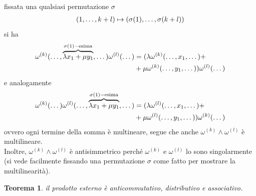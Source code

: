 \documentclass[oneside, 11pt]{amsbook}
\makeatletter
\newcommand{\0}{{(0)}}
\newcommand{\3}{{(3)}}
\theoremstyle{colonplain}
\newtheorem{thm}{Teorema}[chapter]
\theoremstyle{colondefinition}
\theoremstyle{colonremark}
\numberwithin{equation}{chapter}
\renewcommand{\proofname}{Dimostrazione}
\renewenvironment{proof}[1][\proofname]{\par
  \pushQED{\qed}%
  \normalfont \topsep6\p@\@plus6\p@\relax
  \trivlist
  \item[\hskip\labelsep\bfseries #1:]\ignorespaces
}{%
  \popQED\endtrivlist\@endpefalse
}
\makeatother
\begin{document}
\begin{proof} fissata una qualsiasi permutazione $\sigma$
\begin{align}
    (1, \dots, k + l) \mapsto (\sigma(1), \dots, \sigma(k + l)) \notag
\end{align}
si ha
\begin{align}
    \omega^{(k)}(\dots, \overbrace{\lambda x_1 + \mu y_1}^{\sigma(1)-\text{esima}}, \dots)\omega^{(l)}(\dots) &= (\lambda\omega^{(k)}(\dots, x_1, \dots) + \notag \\
    &+ \mu\omega^{(k)}(\dots, y_1, \dots))\omega^{(l)}(\dots) \notag
\end{align}
e analogamente 
\begin{align}
    \omega^{(k)}(\dots)\omega^{(l)}(\dots, \overbrace{\lambda x_1 + \mu y_1}^{\sigma(1)-\text{esima}}, \dots) &= (\lambda\omega^{(l)}(\dots, x_1, \dots) + \notag \\
    &+ \mu\omega^{(l)}(\dots, y_1, \dots))\omega^{(k)}(\dots) \notag
\end{align}
ovvero ogni termine della somma è multineare, segue che anche $\omega^{(k)} \wedge \omega^{(l)}$ è multilineare. \\
Inoltre, $\omega^{(k)} \wedge \omega^{(l)}$ è antisimmetrico perché $\omega^{(k)}$ e $\omega^{(l)}$ lo sono singolarmente (si vede facilmente fissando una permutazione $\sigma$ come fatto per mostrare la multilinearità).
\end{proof}
\begin{thm} il prodotto esterno è anticommutativo, distributivo e associativo.
\end{thm}
\end{document}
